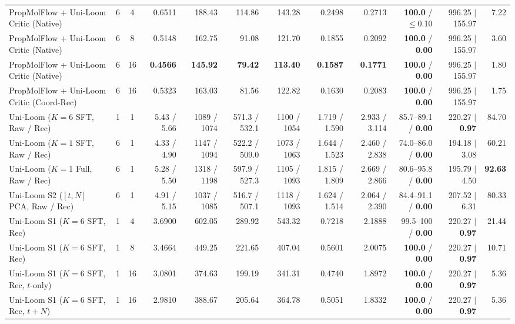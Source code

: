 \documentclass[11pt,a4paper]{article}
\begin{document}
\begin{table}[!h]
{\begin{tabular}{@{}lccrrrrrrrrr@{}}
    PropMolFlow + Uni-Loom Critic (Native) & 6 & 4 & 0.6511 & 188.43 & 114.86 & 143.28 & 0.2498 & 0.2713 & \textbf{100.0} / $\le$0.10 & 996.25 $\mid$ 155.97 & 7.22 \\
    PropMolFlow + Uni-Loom Critic (Native) & 6 & 8 & 0.5148 & 162.75 & 91.08 & 121.70 & 0.1855 & 0.2092 & \textbf{100.0} / \textbf{0.00} & 996.25 $\mid$ 155.97 & 3.60 \\
    PropMolFlow + Uni-Loom Critic (Native) & 6 & 16 & \textbf{0.4566} & \textbf{145.92} & \textbf{79.42} & \textbf{113.40} & \textbf{0.1587} & \textbf{0.1771} & \textbf{100.0} / \textbf{0.00} & 996.25 $\mid$ 155.97 & 1.80 \\
    PropMolFlow + Uni-Loom Critic (Coord-Rec) & 6 & 16 & 0.5323 & 163.03 & 81.56 & 122.82 & 0.1630 & 0.2083 & \textbf{100.0} / \textbf{0.00} & 996.25 $\mid$ 155.97 & 1.75 \\
    \midrule
    Uni-Loom ($K=6$ SFT, Raw / Rec) & 1 & 1 & 5.43 / 5.66 & 1089 / 1074 & 571.3 / 532.1 & 1100 / 1054 & 1.719 / 1.590 & 2.933 / 3.114 & 85.7--89.1 / \textbf{0.00} & 220.27 $\mid$ \textbf{0.97} & 84.70 \\
    Uni-Loom ($K=1$ SFT, Raw / Rec) & 6 & 1 & 4.33 / 4.90 & 1147 / 1094 & 522.2 / 509.0 & 1073 / 1063 & 1.644 / 1.523 & 2.460 / 2.838 & 74.0--86.0 / \textbf{0.00} & 194.18 $\mid$ 3.08 & 60.21 \\
    Uni-Loom ($K=1$ Full, Raw / Rec) & 6 & 1 & 5.28 / 5.50 & 1318 / 1198 & 597.9 / 527.3 & 1105 / 1093 & 1.815 / 1.809 & 2.669 / 2.866 & 80.6--95.8 / \textbf{0.00} & 195.79 $\mid$ 4.50 & \textbf{92.63} \\
    Uni-Loom S2 ($[t,N]$ PCA, Raw / Rec) & 6 & 1 & 4.91 / 5.15 & 1037 / 1085 & 516.7 / 507.1 & 1118 / 1093 & 1.624 / 1.514 & 2.064 / 2.390 & 84.4--91.1 / \textbf{0.00} & 207.52 $\mid$ 6.31 & 80.33 \\
    \midrule
    Uni-Loom S1 ($K=6$ SFT, Rec) & 1 & 4 & 3.6900 & 602.05 & 289.92 & 543.32 & 0.7218 & 2.1888 & 99.5--100 / \textbf{0.00} & 220.27 $\mid$ \textbf{0.97} & 21.44 \\
    Uni-Loom S1 ($K=6$ SFT, Rec) & 1 & 8 & 3.4664 & 449.25 & 221.65 & 407.04 & 0.5601 & 2.0075 & \textbf{100.0} / \textbf{0.00} & 220.27 $\mid$ \textbf{0.97} & 10.71 \\
    Uni-Loom S1 ($K=6$ SFT, Rec, $t$-only) & 1 & 16 & 3.0801 & 374.63 & 199.19 & 341.31 & 0.4740 & 1.8972 & \textbf{100.0} / \textbf{0.00} & 220.27 $\mid$ \textbf{0.97} & 5.36 \\
    Uni-Loom S1 ($K=6$ SFT, Rec, $t+N$) & 1 & 16 & 2.9810 & 388.67 & 205.64 & 364.78 & 0.5051 & 1.8332 & \textbf{100.0} / \textbf{0.00} & 220.27 $\mid$ \textbf{0.97} & 5.36 \\

\end{tabular}}
\end{table}
\end{document}
